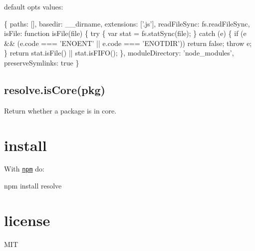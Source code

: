 default {\ttfamily opts} values\+:


\begin{DoxyCode}
\{
    paths: [],
    basedir: \_\_dirname,
    extensions: ['.js'],
    readFileSync: fs.readFileSync,
    isFile: function isFile(file) \{
        try \{
            var stat = fs.statSync(file);
        \} catch (e) \{
            if (e && (e.code === 'ENOENT' || e.code === 'ENOTDIR')) return false;
            throw e;
        \}
        return stat.isFile() || stat.isFIFO();
    \},
    moduleDirectory: 'node\_modules',
    preserveSymlinks: true
\}
\end{DoxyCode}


\subsection*{resolve.\+is\+Core(pkg)}

Return whether a package is in core.

\section*{install}

With \href{https://npmjs.org}{\tt npm} do\+:


\begin{DoxyCode}
npm install resolve
\end{DoxyCode}


\section*{license}

M\+IT 
